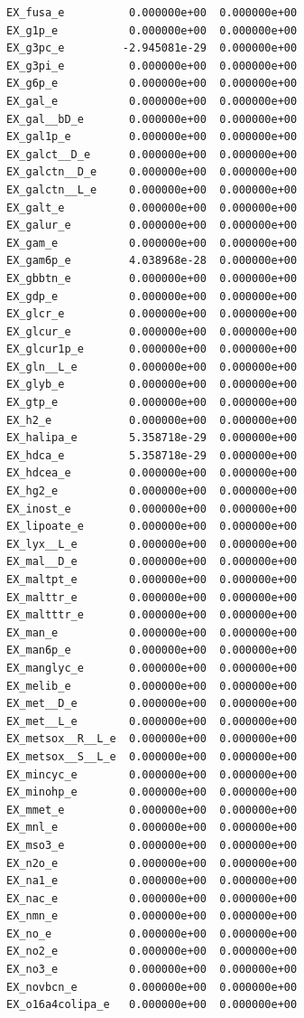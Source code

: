 \documentclass{scrartcl}
\begin{document}
\begin{enumerate}
\begin{lstlisting}
EX_fusa_e          0.000000e+00  0.000000e+00
EX_g1p_e           0.000000e+00  0.000000e+00
EX_g3pc_e         -2.945081e-29  0.000000e+00
EX_g3pi_e          0.000000e+00  0.000000e+00
EX_g6p_e           0.000000e+00  0.000000e+00
EX_gal_e           0.000000e+00  0.000000e+00
EX_gal__bD_e       0.000000e+00  0.000000e+00
EX_gal1p_e         0.000000e+00  0.000000e+00
EX_galct__D_e      0.000000e+00  0.000000e+00
EX_galctn__D_e     0.000000e+00  0.000000e+00
EX_galctn__L_e     0.000000e+00  0.000000e+00
EX_galt_e          0.000000e+00  0.000000e+00
EX_galur_e         0.000000e+00  0.000000e+00
EX_gam_e           0.000000e+00  0.000000e+00
EX_gam6p_e         4.038968e-28  0.000000e+00
EX_gbbtn_e         0.000000e+00  0.000000e+00
EX_gdp_e           0.000000e+00  0.000000e+00
EX_glcr_e          0.000000e+00  0.000000e+00
EX_glcur_e         0.000000e+00  0.000000e+00
EX_glcur1p_e       0.000000e+00  0.000000e+00
EX_gln__L_e        0.000000e+00  0.000000e+00
EX_glyb_e          0.000000e+00  0.000000e+00
EX_gtp_e           0.000000e+00  0.000000e+00
EX_h2_e            0.000000e+00  0.000000e+00
EX_halipa_e        5.358718e-29  0.000000e+00
EX_hdca_e          5.358718e-29  0.000000e+00
EX_hdcea_e         0.000000e+00  0.000000e+00
EX_hg2_e           0.000000e+00  0.000000e+00
EX_inost_e         0.000000e+00  0.000000e+00
EX_lipoate_e       0.000000e+00  0.000000e+00
EX_lyx__L_e        0.000000e+00  0.000000e+00
EX_mal__D_e        0.000000e+00  0.000000e+00
EX_maltpt_e        0.000000e+00  0.000000e+00
EX_malttr_e        0.000000e+00  0.000000e+00
EX_maltttr_e       0.000000e+00  0.000000e+00
EX_man_e           0.000000e+00  0.000000e+00
EX_man6p_e         0.000000e+00  0.000000e+00
EX_manglyc_e       0.000000e+00  0.000000e+00
EX_melib_e         0.000000e+00  0.000000e+00
EX_met__D_e        0.000000e+00  0.000000e+00
EX_met__L_e        0.000000e+00  0.000000e+00
EX_metsox__R__L_e  0.000000e+00  0.000000e+00
EX_metsox__S__L_e  0.000000e+00  0.000000e+00
EX_mincyc_e        0.000000e+00  0.000000e+00
EX_minohp_e        0.000000e+00  0.000000e+00
EX_mmet_e          0.000000e+00  0.000000e+00
EX_mnl_e           0.000000e+00  0.000000e+00
EX_mso3_e          0.000000e+00  0.000000e+00
EX_n2o_e           0.000000e+00  0.000000e+00
EX_na1_e           0.000000e+00  0.000000e+00
EX_nac_e           0.000000e+00  0.000000e+00
EX_nmn_e           0.000000e+00  0.000000e+00
EX_no_e            0.000000e+00  0.000000e+00
EX_no2_e           0.000000e+00  0.000000e+00
EX_no3_e           0.000000e+00  0.000000e+00
EX_novbcn_e        0.000000e+00  0.000000e+00
EX_o16a4colipa_e   0.000000e+00  0.000000e+00

\end{lstlisting}
\end{enumerate}
\end{document}
